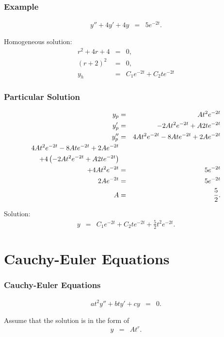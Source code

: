 \begin{frame}
  \frametitle{Example}

  \begin{eqnarray*}
    y'' + 4y' + 4y & = & 5 e^{-2t}.
  \end{eqnarray*}

  {
    Homogeneous solution:
    \begin{eqnarray*}
      r^2 + 4r + 4 & = & 0, \\
      (r+2)^2 & = & 0, \\
      y_h & = & C_1 e^{-2t} + C_2 t e^{-2t}
    \end{eqnarray*}
  }

\end{frame}

\begin{frame}
  \frametitle{Particular Solution}

  \begin{eqnarray*}
    y_p & = & A t^2 e^{-2t} \\
    y_p' & = & -2 A t^2 e^{-2t} + A 2t e^{-2t} \\
    y_p'' & = & 4 A t^2 e^{-2t} - 8A t e^{-2t} + 2 A e^{-2t} \\
    4 A t^2 e^{-2t} - 8A t e^{-2t} + 2 A e^{-2t} & & \\
    + 4 \left( -2 A t^2 e^{-2t} + A 2t e^{-2t} \right) & & \\
    + 4 A t^2 e^{-2t} & = & 5 e^{-2t} \\
    2 A e^{-2t} & = & 5 e^{-2t} \\
    A & = & \frac{5}{2}.
  \end{eqnarray*}

  Solution:
  \begin{eqnarray*}
    y & = & C_1 e^{-2t} + C_2 t e^{-2 t} + \frac{5}{2} t^2 e^{-2t}.
  \end{eqnarray*}

\end{frame}

\section{Cauchy-Euler Equations}

\begin{frame}
  \frametitle{Cauchy-Euler Equations}

  \begin{eqnarray*}
    a t^2 y'' + b t y' + c y & = & 0.
  \end{eqnarray*}

  {
    Assume that the solution is in the form of
    \begin{eqnarray*}
      y & = & A t^r.
    \end{eqnarray*}
  }

\end{frame}


